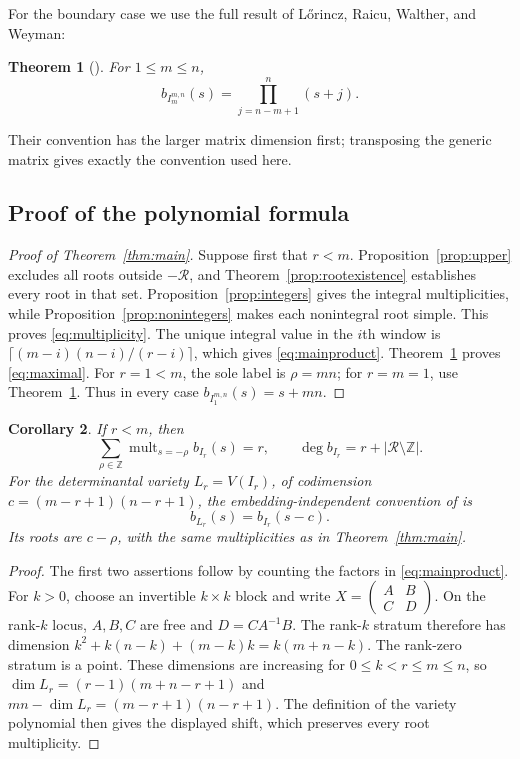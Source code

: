 \documentclass[11pt,a4paper]{article}
\numberwithin{equation}{section}
\newtheorem{theorem}{Theorem}[section]
\newtheorem{corollary}[theorem]{Corollary}
\theoremstyle{definition}
\newcommand{\Z}{\mathbb Z}
\DeclareMathOperator{\mult}{mult}
\begin{document}
For the boundary case we use the full result of
L\H orincz, Raicu, Walther, and Weyman:
\begin{theorem}[{\cite[Theorem~4.1]{LRWW}}]\label{thm:knownmaximal}
For $1\le m\le n$,
\[
b_{I_m^{m,n}}(s)=\prod_{j=n-m+1}^{n}(s+j).
\]
\end{theorem}
Their convention has the larger matrix dimension first; transposing
the generic matrix gives exactly the convention used here.

\subsection{Proof of the polynomial formula}\label{subsec:completion}
\begin{proof}[Proof of Theorem~\ref{thm:main}]
Suppose first that $r<m$. Proposition~\ref{prop:upper} excludes all
roots outside $-\mathcal R$, and Theorem~\ref{prop:rootexistence}
establishes every root in that set. Proposition~\ref{prop:integers}
gives the integral multiplicities, while
Proposition~\ref{prop:nonintegers} makes each nonintegral root simple.
This proves \eqref{eq:multiplicity}. The unique integral value in
the $i$th window is $\lceil(m-i)(n-i)/(r-i)\rceil$, which gives
\eqref{eq:mainproduct}. Theorem~\ref{thm:knownmaximal} proves
\eqref{eq:maximal}. For $r=1<m$, the sole label is $\rho=mn$;
for $r=m=1$, use Theorem~\ref{thm:knownmaximal}. Thus in every case
$b_{I_1^{m,n}}(s)=s+mn$.
\end{proof}

\begin{corollary}\label{cor:degree}
If $r<m$, then
\[
\sum_{\rho\in\Z}\mult_{s=-\rho}b_{I_r}(s)=r,\qquad
\deg b_{I_r}=r+|\mathcal R\setminus\Z|.
\]
For the determinantal variety $L_r=V(I_r)$, of codimension
$c=(m-r+1)(n-r+1)$, the embedding-independent convention of
\cite{BMS} is
\[
b_{L_r}(s)=b_{I_r}(s-c).
\]
Its roots are $c-\rho$, with the same multiplicities as in
Theorem~\ref{thm:main}.
\end{corollary}
\begin{proof}
The first two assertions follow by counting the factors in
\eqref{eq:mainproduct}. For $k>0$, choose an invertible $k\times k$ block and write
$X=\left(\begin{smallmatrix}A&B\\ C&D\end{smallmatrix}\right)$.
On the rank-$k$ locus, $A,B,C$ are free and $D=CA^{-1}B$.
The rank-$k$ stratum therefore has dimension
$k^2+k(n-k)+(m-k)k=k(m+n-k)$.
The rank-zero stratum is a point. These dimensions are increasing
for $0\le k<r\le m\le n$, so
$\dim L_r=(r-1)(m+n-r+1)$ and
$mn-\dim L_r=(m-r+1)(n-r+1)$.
The definition of the variety polynomial then gives the displayed
shift, which preserves every root multiplicity.
\end{proof}
\end{document}
